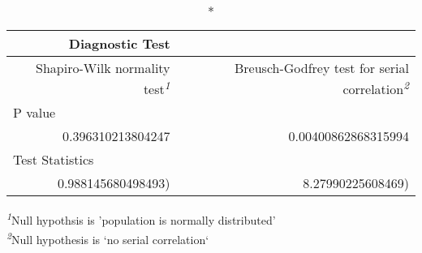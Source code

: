 \setlength{\LTpost}{0mm}
\begin{longtable}{rr}
\caption*{
{\large Diagnostic Test}
} \\ 
\toprule
Shapiro-Wilk normality test\textsuperscript{\textit{1}} & Breusch-Godfrey test for serial correlation\textsuperscript{\textit{2}} \\ 
\midrule
\multicolumn{2}{l}{P value} \\ 
\midrule
0.396310213804247 & 0.00400862868315994 \\ 
\midrule
\multicolumn{2}{l}{Test Statistics} \\ 
0.988145680498493) & 8.27990225608469) \\ 
\bottomrule
\end{longtable}
\begin{minipage}{\linewidth}
\textsuperscript{\textit{1}}Null hypothsis is 'population is normally distributed'\\
\textsuperscript{\textit{2}}Null hypothesis is `no serial correlation`\\
\end{minipage}

